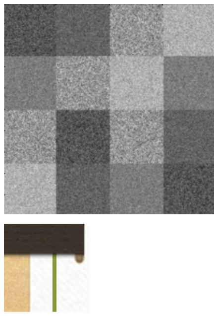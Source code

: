 \documentclass[11pt]{article}
\begin{document}
\begin{figure}[!htb]
\begin{center}
\begin{multicols}{4}
    \includegraphics[height = \linewidth]{squares}\par
	\includegraphics[height = \linewidth]{test}\

\end{multicols}
\end{center}
\end{figure}
\end{document}
